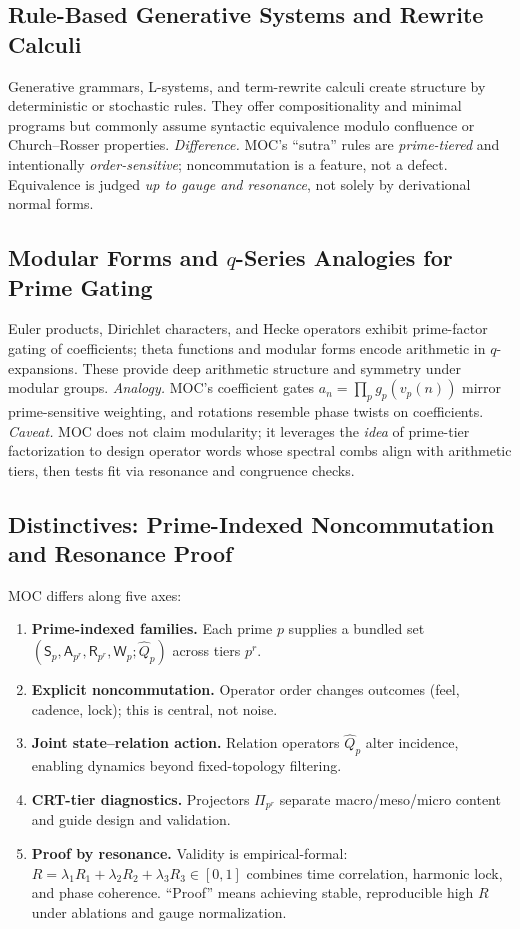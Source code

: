 \documentclass[12pt]{article}
\numberwithin{equation}{section}
\theoremstyle{plain}
\theoremstyle{definition}
\theoremstyle{remark}
\begin{document}
\subsection*{Rule-Based Generative Systems and Rewrite Calculi}
Generative grammars, L-systems, and term-rewrite calculi create structure by deterministic or stochastic rules. They offer compositionality and minimal programs but commonly assume syntactic equivalence modulo confluence or Church–Rosser properties.
\emph{Difference.} MOC’s “sutra” rules are \emph{prime-tiered} and intentionally \emph{order-sensitive}; noncommutation is a feature, not a defect. Equivalence is judged \emph{up to gauge and resonance}, not solely by derivational normal forms.

\subsection*{Modular Forms and $q$-Series Analogies for Prime Gating}
Euler products, Dirichlet characters, and Hecke operators exhibit prime-factor gating of coefficients; theta functions and modular forms encode arithmetic in $q$-expansions. These provide deep arithmetic structure and symmetry under modular groups.
\emph{Analogy.} MOC’s coefficient gates $a_n=\prod_p g_p(v_p(n))$ mirror prime-sensitive weighting, and rotations resemble phase twists on coefficients.
\emph{Caveat.} MOC does not claim modularity; it leverages the \emph{idea} of prime-tier factorization to design operator words whose spectral combs align with arithmetic tiers, then tests fit via resonance and congruence checks.

\subsection*{Distinctives: Prime-Indexed Noncommutation and Resonance Proof}
MOC differs along five axes:
\begin{enumerate}
  \item \textbf{Prime-indexed families.} Each prime $p$ supplies a bundled set \((\mathsf{S}_p,\mathsf{A}_{p^r},\mathsf{R}_{p^r},\mathsf{W}_p;\hat{Q}_p)\) across tiers $p^r$.
  \item \textbf{Explicit noncommutation.} Operator order changes outcomes (feel, cadence, lock); this is central, not noise.
  \item \textbf{Joint state–relation action.} Relation operators $\hat{Q}_p$ alter incidence, enabling dynamics beyond fixed-topology filtering.
  \item \textbf{CRT-tier diagnostics.} Projectors $\Pi_{p^r}$ separate macro/meso/micro content and guide design and validation.
  \item \textbf{Proof by resonance.} Validity is empirical-formal: $R=\lambda_1R_1+\lambda_2R_2+\lambda_3R_3\in[0,1]$ combines time correlation, harmonic lock, and phase coherence. “Proof” means achieving stable, reproducible high $R$ under ablations and gauge normalization.
\end{enumerate}
\end{document}
